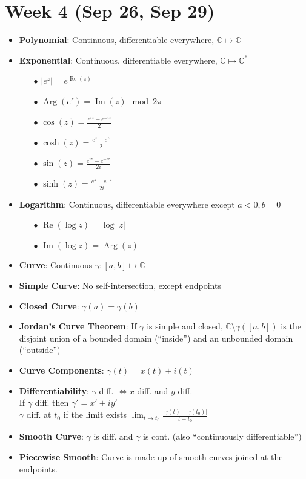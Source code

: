 \documentclass[12pt]{article}
\newcommand{\C}{\mathbb{C}}
\DeclareMathOperator{\real}{Re}
\DeclareMathOperator{\imgn}{Im}
\DeclareMathOperator{\agmt}{Arg}
\begin{document}
\section*{Week 4 (Sep 26, Sep 29)}
\begin{itemize}
    \item \textbf{Polynomial}: Continuous, differentiable everywhere, $\C\mapsto\C$
    \item \textbf{Exponential}: Continuous, differentiable everywhere, $\C\mapsto\C^*$
    \begin{itemize}
        \item[$\bullet$] $|e^z|=e^{\real(z)}$
        \item[$\bullet$] $\agmt(e^z)=\imgn(z)\mod2\pi$
        \item[$\bullet$] $\cos(z)=\frac{e^{iz}+e^{-iz}}{2}$
        \item[$\bullet$] $\cosh(z)=\frac{e^{z}+e^{z}}{2}$
        \item[$\bullet$] $\sin(z)=\frac{e^{iz}-e^{-iz}}{2i}$
        \item[$\bullet$] $\sinh(z)=\frac{e^{z}-e^{-z}}{2i}$
    \end{itemize}
    \item \textbf{Logarithm}: Continuous, differentiable everywhere except $a<0,b=0$
    \begin{itemize}
        \item[$\bullet$] $\real(\log z)=\log|z|$
        \item[$\bullet$] $\imgn(\log z)=\agmt(z)$
    \end{itemize}
    \item \textbf{Curve}: Continuous $\gamma:[a,b]\mapsto\C$
    \item \textbf{Simple Curve}: No self-intersection, except endpoints
    \item \textbf{Closed Curve}: $\gamma(a)=\gamma(b)$
    \item \textbf{Jordan's Curve Theorem}: If $\gamma$ is simple and closed, $\C\setminus\gamma([a,b])$ is the disjoint union of a bounded domain (``inside'') and an unbounded domain (``outside'')
    \item \textbf{Curve Components}: $\gamma(t)=x(t)+i(t)$
    \item \textbf{Differentiability}: $\gamma$ diff. $\iff x$ diff. and $y$ diff. \\
    If $\gamma$ diff. then $\gamma'=x'+iy'$ \\
    $\gamma$ diff. at $t_0$ if the limit exists $\lim_{t\rightarrow t_0}\frac{|\gamma(t)-\gamma(t_0)|}{t-t_0}$
    \item \textbf{Smooth Curve}: $\gamma$ is diff. and $\gamma$ is cont. (also ``continuously differentiable'')
    \item \textbf{Piecewise Smooth}: Curve is made up of smooth curves joined at the endpoints.
\end{itemize}
\end{document}
